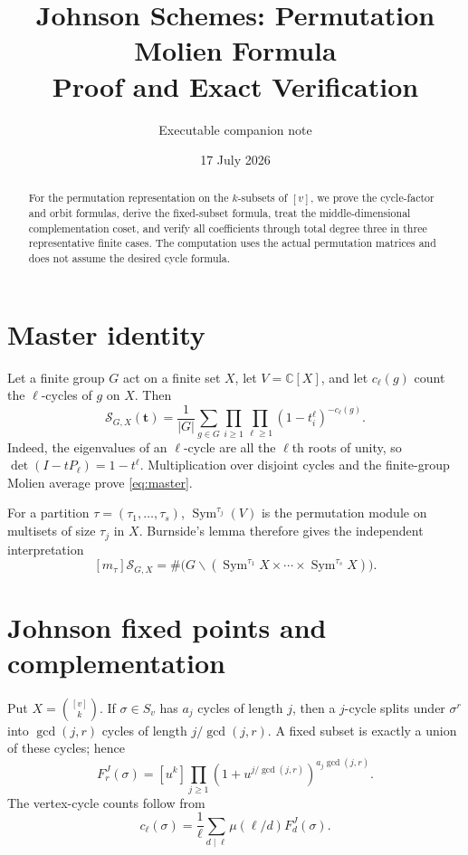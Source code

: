 \documentclass[11pt]{article}
\title{Johnson Schemes: Permutation Molien Formula\\Proof and Exact Verification}
\author{Executable companion note}
\date{17 July 2026}
\newcommand{\Sym}{\operatorname{Sym}}
\newcommand{\cS}{\mathcal S}
\begin{document}
\maketitle
\begin{abstract}
For the permutation representation on the $k$-subsets of $[v]$, we prove the
cycle-factor and orbit formulas, derive the fixed-subset formula, treat the
middle-dimensional complementation coset, and verify all coefficients through
total degree three in three representative finite cases.  The computation uses
the actual permutation matrices and does not assume the desired cycle formula.
\end{abstract}

\section{Master identity}
Let a finite group $G$ act on a finite set $X$, let $V=\mathbb C[X]$, and let
$c_\ell(g)$ count the $\ell$-cycles of $g$ on $X$.  Then
\begin{equation}\label{eq:master}
 \cS_{G,X}(\mathbf t)=\frac1{|G|}\sum_{g\in G}
 \prod_{i\ge1}\prod_{\ell\ge1}(1-t_i^\ell)^{-c_\ell(g)}.
\end{equation}
Indeed, the eigenvalues of an $\ell$-cycle are all the $\ell$th roots of
unity, so $\det(I-tP_\ell)=1-t^\ell$.  Multiplication over disjoint cycles and
the finite-group Molien average prove \eqref{eq:master}.

For a partition $\tau=(\tau_1,\ldots,\tau_s)$, $\Sym^{\tau_j}(V)$ is the
permutation module on multisets of size $\tau_j$ in $X$.  Burnside's lemma
therefore gives the independent interpretation
\begin{equation}\label{eq:orbit}
 [m_\tau]\cS_{G,X}=\#\bigl(G\backslash
 (\Sym^{\tau_1}X\times\cdots\times\Sym^{\tau_s}X)\bigr).
\end{equation}

\section{Johnson fixed points and complementation}
Put $X=\binom{[v]}k$.  If $\sigma\in S_v$ has $a_j$ cycles of length $j$,
then a $j$-cycle splits under $\sigma^r$ into $\gcd(j,r)$ cycles of length
$j/\gcd(j,r)$.  A fixed subset is exactly a union of these cycles; hence
\begin{equation}\label{eq:johnsonfixed}
 F_r^J(\sigma)=[u^k]\prod_{j\ge1}
 \left(1+u^{j/\gcd(j,r)}\right)^{a_j\gcd(j,r)}.
\end{equation}
The vertex-cycle counts follow from
\begin{equation}\label{eq:mobius}
 c_\ell(\sigma)=\frac1\ell\sum_{d\mid\ell}
 \mu(\ell/d)F_d^J(\sigma).
\end{equation}
\end{document}
